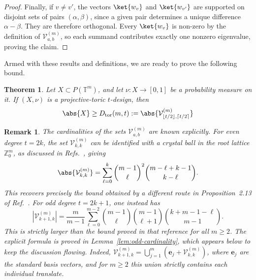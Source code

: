 \documentclass[aps,twocolumn,pra,superscriptaddress,nofootinbib]{revtex4-2}
\newtheorem{theorem}{Theorem}
\newtheorem{remark}{Remark}
\begin{document}
\begin{proof}
    Finally, if $v\neq v'$, the vectors $\ket{w_v}$ and
    $\ket{w_{v'}}$ are supported on disjoint sets of pairs
    $(\alpha,\beta)$, since a given pair determines a unique difference
    $\alpha-\beta$. They are therefore orthogonal. Every
    $\ket{w_v}$ is non-zero by the definition of
    $\mathcal{V}_{a,b}^{(m)}$, so each summand contributes exactly one
    nonzero eigenvalue, proving the claim.
\end{proof}





Armed with these results and definitions, we are ready to prove the
following bound.

\begin{theorem}
    Let $X\subset P(\mathbb{T}^{m})$, and let
    $\nu:X\rightarrow [0,1]$ be a probability measure on it. If
    $(X,\nu)$ is a projective-toric $t$-design, then
    \begin{equation}
        \abs{X}\geq D_{\mathrm{tor}}(m,t):=\abs{\mathcal{V}_{\lfloor t/2\rfloor,\lceil t/2\rceil }^{(m)}}
    \end{equation}
\end{theorem}
\begin{remark}
The cardinalities of the sets $\mathcal{V}_{a,b}^{(m)}$ are known
explicitly. For even degree $t=2k$, the set
$\mathcal{V}_{k,k}^{(m)}$ can be identified with a crystal ball in the
root lattice $\mathbb{Z}_{0}^{m}$, as discussed in
Refs.~\cite{ConwaySloane1997Coordination,IosueEtAl2024}, giving
\begin{equation}
    \abs{\mathcal{V}_{k,k}^{(m)}}
    =
    \sum_{\ell=0}^{k}
    \binom{m-1}{\ell}^{2}
    \binom{m-\ell+k-1}{k-\ell}.
    \label{eq:crystal-ball-number}
\end{equation}
This recovers precisely the bound obtained by a different route in
Proposition~2.13 of Ref.~\cite{IosueEtAl2024}. For odd degree
$t=2k+1$, one instead has
\begin{equation}
    \left|\mathcal{V}_{k+1,k}^{(m)}\right|
    =
    \frac{m}{m-1}
    \sum_{\ell=0}^{m-2}
    \binom{m-1}{\ell}
    \binom{m-1}{\ell+1}
    \binom{k+m-1-\ell}{m-1}.
    \label{eq:odd-affine-rank}
\end{equation}
This is strictly larger than the bound proved in that reference for all
$m\geq 2$. The explicit formula is proved in
Lemma~\ref{lem:odd-cardinality}, which appears below to keep the
discussion flowing.
Indeed, $\mathcal V_{k+1,k}^{(m)}=\bigcup_{j=1}^{m}(\mathbf e_j+\mathcal V_{k,k}^{(m)})$, where $\mathbf e_j$ are the standard basis vectors, and for $m\geq2$ this union strictly contains each individual translate.
\end{remark}
\end{document}
